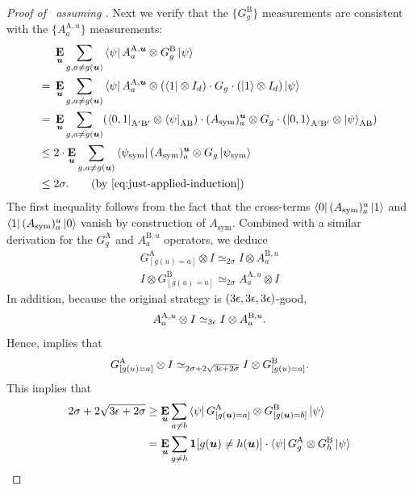 \begin{proof}[Proof of~ assuming ]
Next we verify that the $\{G^{\mathrm{B}}_g\}$ measurements are consistent with the $\{A^{\mathrm{A},u}_a\}$ measurements:
\begin{align*}
    &\E_{\bu} \sum_{g,a \neq g(\bu)} \bra{\psi} A^{\mathrm{A},\bu}_a \otimes G^{\mathrm{B}}_g \ket{\psi} \notag \\
    ={}& \E_{\bu} \sum_{g,a \neq g(\bu)} \bra{\psi} A^{\mathrm{A},\bu}_a \otimes (\bra{1} \otimes I_d) \cdot G_g \cdot (\ket{1} \otimes I_d) \ket{\psi} \notag \\
    ={}& \E_{\bu} \sum_{g,a \neq g(\bu)} (\bra{0,1}_{\mathrm{A'B'}} \otimes \bra{\psi}_{\mathrm{AB}}) \cdot (A_{\mathrm{sym}})^{\bu}_a \otimes G_g \cdot (\ket{0,1}_{\mathrm{A'B'}} \otimes \ket{\psi}_{\mathrm{AB}}) \notag \\
    \leq{}& 2 \cdot \E_{\bu} \sum_{g,a \neq g(\bu)} \bra{\psi_{\mathrm{sym}}} (A_{\mathrm{sym}})^{\bu}_a \otimes G_g \ket{\psi_{\mathrm{sym}}} \notag \\
    \leq{}& 2\sigma. \tag{by \Cref{eq:just-applied-induction}}
\end{align*}
The first inequality follows from the fact that the cross-terms $\bra{0} (A_{\mathrm{sym}})_a^{u} \ket{1}$ and $\bra{1} (A_{\mathrm{sym}})_a^{u} \ket{0}$ vanish by construction of $A_{\mathrm{sym}}$.  Combined with a similar derivation for the $G^{\mathrm{A}}_g$ and $A^{\mathrm{B},u}_a$ operators, we deduce
\begin{gather}
    G^{\mathrm{A}}_{[g(u)=a]} \otimes I \simeq_{2\sigma} I \otimes A^{\mathrm{B},u}_a \label{eq:cons-a}\\
    I \otimes G^{\mathrm{B}}_{[g(u)=a]} \simeq_{2\sigma}  A^{\mathrm{A},u}_a \otimes I \label{eq:cons-b}
\end{gather}
In addition, because the original strategy is $(3\epsilon, 3\epsilon, 3\epsilon)$-good,
\begin{equation*}
A^{\mathrm{A},u}_a \otimes I \simeq_{3\epsilon} I \otimes A^{\mathrm{B},u}_a.
\end{equation*}
Hence,  implies that
\begin{equation*}
G^{\mathrm{A}}_{[g(u)=a]} \otimes I \simeq_{2\sigma + 2\sqrt{3\epsilon + 2\sigma}} I \otimes G^{\mathrm{B}}_{[g(u)=a]}.
\end{equation*}
This implies that
\begin{align*}
2\sigma + 2\sqrt{3\eps + 2\sigma}
& \geq \E_{\bu} \sum_{a \neq b} \bra{\psi} G^{\mathrm{A}}_{[g(\bu) =a]} \ot G^{\mathrm{B}}_{[g(\bu) = b]} \ket{\psi}\\
& = \E_{\bu} \sum_{g \neq h}  \bone[g(\bu) \neq h(\bu)] \cdot \bra{\psi} G^{\mathrm{A}}_{g} \ot G^{\mathrm{B}}_{h} \ket{\psi}\\

\end{align*}
\end{proof}
